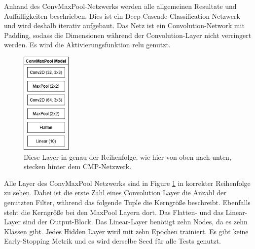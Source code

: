 Anhand des ConvMaxPool-Netzwerks werden alle allgemeinen Resultate und Auffälligkeiten beschrieben. 
Dies ist ein Deep Cascade Classification Netzwerk und wird deshalb iterativ aufgebaut. 
Das Netz ist ein Convolution-Network mit Padding, sodass die Dimensionen während der Convolution-Layer nicht verringert werden. 
Es wird die Aktivierungsfunktion relu genutzt. 

\begin{figure}[htpb]
    \centering
    \includegraphics[height=5cm]{../../Graphiken/convmaxpool.png}
    \caption{\label{fig:convmaxpool} 
    \small{Diese Layer in genau der Reihenfolge, wie hier von oben nach unten, stecken hinter dem CMP-Netzwerk.}}
\end{figure}

Alle Layer des ConvMaxPool Netzwerks sind in Figure \ref{fig:convmaxpool} in korrekter Reihenfolge zu sehen. Dabei ist die erste Zahl eines Convolution Layer 
die Anzahl der genutzten Filter, während das folgende Tuple die Kerngröße beschreibt. Ebenfalls steht die Kerngröße bei den MaxPool Layern dort. 
Das Flatten- und das Linear-Layer sind der Output-Block. Das Linear-Layer benötigt zehn Nodes, da es zehn Klassen gibt. Jedes Hidden Layer wird 
mit zehn Epochen trainiert. Es gibt keine Early-Stopping Metrik und es wird derselbe Seed für alle Tests genutzt. 
